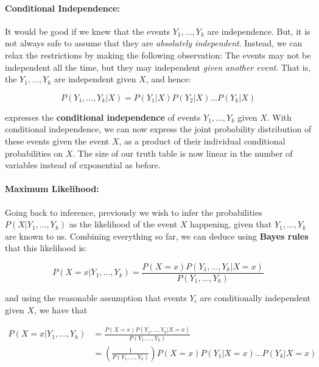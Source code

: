 \documentclass[12pt]{article}
\begin{document}
\paragraph{Conditional Independence:} It would be good if we knew that the events $Y_1,...,Y_k$ are independence. But, it is not always safe to assume that they are \textit{absolutely independent}. Instead, we can relax the restrictions by making the following observation: The events may not be independent all the time, but they may independent \textit{given another event}. That is, the $Y_1,...,Y_k$ are independent given $X$, and hence:

\begin{equation*}
P(Y_1,...,Y_k | X) = P(Y_1|X)P(Y_2|X)...P(Y_k|X)
\end{equation*}

expresses the \textbf{conditional independence} of events $Y_1,...,Y_k$ given $X$. With conditional independence, we can now express the joint probability distribution of these events given the event $X$, as a product of their individual conditional probabilities on $X$. The size of our truth table is now linear in the number of variables instead of exponential as before.

\paragraph{Maximum Likelihood:}
Going back to inference, previously we wish to infer the probabilities $P(X| Y_1,...,Y_k)$ as the likelihood of the event $X$ happening, given that $Y_1,...,Y_k$ are known to us. Combining everything so far, we can deduce using \textbf{Bayes rules} that this likelihood is:

\begin{equation*}
P(X = x | Y_1,...,Y_k) = \frac{P(X = x)P(Y_1,...,Y_k | X = x)}{P(Y_1,...,Y_k)}
\end{equation*}

and using the reasonable assumption that events $Y_i$ are conditionally independent given $X$, we have that

\begin{equation*}
\begin{aligned}
P(X = x | Y_1,...,Y_k) &= \frac{P(X = x)P(Y_1,...,Y_k | X = x)}{P(Y_1,...,Y_k)}\\
&= \left( \frac{1}{P(Y_1,...,Y_k)} \right) P(X = x)P(Y_1| X = x)...P(Y_k| X = x)
\end{aligned}
\end{equation*}
\end{document}
